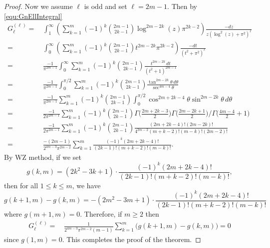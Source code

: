 \documentclass[11pt]{article}
\theoremstyle{plain}
\theoremstyle{definition}
\begin{document}
\begin{proof}
Now we assume $\ell$ is odd and set $\ell=2m-1$. Then by \eqref{equ:GnEllIntegral}
\begin{align*}
G_{\ell}^{(\ell)}=&\,    \int_1^\infty    \left( \sum_{k=1}^m (-1)^k \binom{2m-1}{2k-1}
                                            \log^{2m-2k}(z) \pi^{2k-2}  \right)\frac{-dz}{z(\log^2(z)+\pi^2)^\ell}\\
=&\,   \int_0^\infty  \left( \sum_{k=1}^m (-1)^k \binom{2m-1}{2k-1}
           t^{2m-2k} \pi^{2k-2}  \right)  \frac{ - dt}{(t^2+\pi^2)^\ell}  \\
=&\,  \frac{-1}{\pi^{2m-1}}   \int_0^\infty  \sum_{k=1}^m (-1)^k \binom{2m-1}{2k-1}
                                             \frac{t^{2m-2k} \, dt}{(t^2+1)^{2m-1}}   \\
=&\,  \frac{-1}{\pi^{2m-1}}   \int_0^{\pi/2}  \sum_{k=1}^m (-1)^k \binom{2m-1}{2k-1}
                                           \frac{ \tan^{2m-2k}\theta  \,  d\theta }{\sec^{4m-4}\theta}   \\
=&\,  \frac{-1}{\pi^{2m-1}}  \sum_{k=1}^m (-1)^k \binom{2m-1}{2k-1}  \int_0^{\pi/2}  \cos^{2m+2k-4}\theta
                                          \sin^{2m-2k}\theta  \, d\theta  \\
=&\,  \frac{-1}{2\pi^{2m-1}}  \sum_{k=1}^m (-1)^k \binom{2m-1}{2k-1}  \Gamma\Big(\frac{2m+2k-3}2\Big)\Gamma\Big(\frac{2m-2k+1}2\Big)/ \Gamma\Big(\frac{4m-4}2+1\Big)  \\
=&\,  \frac{-1}{2\pi^{2m-1}}  \sum_{k=1}^m (-1)^k \binom{2m-1}{2k-1} \frac{(2m+2k-4)!(2m-2k)!}{4^{2m-2} (m+k-2)!(m-k)!(2m-2)!} \\
=&\,  \frac{-(2m-1)}{2^{4m-3}\pi^{2m-2}}  \sum_{k=1}^m  \frac{ (-1)^k (2m+2k-4)!}{ (2k-1)!(m+k-2)!(m-k)! }.
\end{align*}
By WZ method, if we set
\begin{equation*}
     g(k,m)=(2k^2 - 3k + 1)\cdot \frac{(-1)^k(2m + 2k - 4)!}{(2k - 1)!(m + k - 2)!(m - k)!},
\end{equation*}
then for all $1\le k\le m$, we have
\begin{equation*}
     g(k+1,m)-g(k,m)=-(2m^2 - 3m + 1)\cdot  \frac{(-1)^k (2m+2k-4)!}{ (2k-1)!(m+k-2)!(m-k)! }
\end{equation*}
where $g(m+1,m)=0$. Therefore, if $m\ge 2$ then
\begin{align*}
 G_{\ell}^{(\ell)}=&\,  \frac{1}{2^{4m-3}\pi^{2m-2}(m-1)}  \sum_{k=1}^m  \Big(g(k+1,m)-g(k,m)\Big)=0
\end{align*}
since $g(1,m)=0$. This completes the proof of the theorem.
\end{proof}
\end{document}
